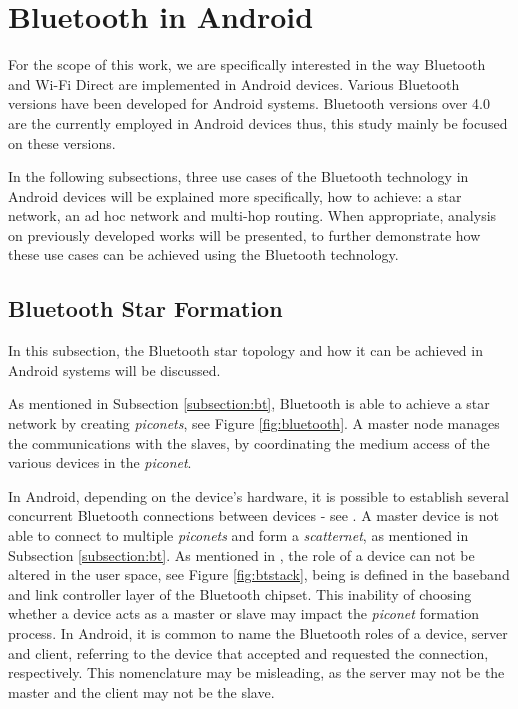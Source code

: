 \section{Bluetooth in Android}

For the scope of this work, we are specifically interested in the way Bluetooth and Wi-Fi Direct are implemented in Android devices. Various Bluetooth versions have been developed for Android systems. Bluetooth versions over 4.0 are the currently employed in Android devices thus, this study mainly be focused on these versions.

In the following subsections, three use cases of the Bluetooth technology in Android devices will be explained more specifically, how to achieve: a star network, an ad hoc network and multi-hop routing. When appropriate, analysis on previously developed works will be presented, to further demonstrate how these use cases can be achieved using the Bluetooth technology.

\subsection{Bluetooth Star Formation}
\label{subsec:btstar}

In this subsection, the Bluetooth star topology and how it can be achieved in Android systems will be discussed.

As mentioned in Subsection \ref{subsection:bt}, Bluetooth is able to achieve a star network by creating \textit{piconets}, see Figure \ref{fig:bluetooth}. A master node manages the communications with the slaves, by coordinating the medium access of the various devices in the \textit{piconet}.

In Android, depending on the device's hardware, it is possible to establish several concurrent Bluetooth connections between devices - see \cite{btmultipleconn}. A master device is not able to connect to multiple \textit{piconets} and form a \textit{scatternet}, as mentioned in Subsection \ref{subsection:bt}. As mentioned in \cite{btmasterchoice}, the role of a device can not be altered in the user space, see Figure \ref{fig:btstack}, being is defined in the baseband and link controller layer of the Bluetooth chipset. This inability of choosing whether a device acts as a master or slave may impact the \textit{piconet} formation process. In Android, it is common to name the Bluetooth roles of a device, server and client, referring to the device that accepted and requested the connection, respectively. This nomenclature may be misleading, as the server may not be the master and the client may not be the slave.

